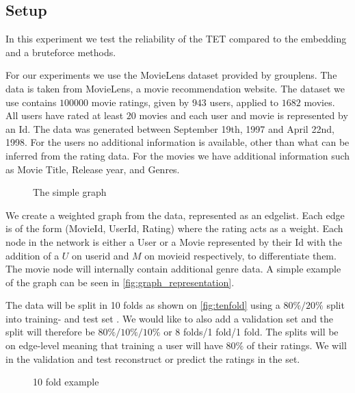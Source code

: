 \subsection{Setup}\label{Subsec:setup}
In this experiment we test the reliability of the TET compared to the embedding and a bruteforce methods. 

For our experiments we use the MovieLens dataset provided by grouplens\cite{Grouplensdata}.
The data is taken from MovieLens, a movie recommendation website. The dataset we use contains $100000$ movie ratings, given by $943$ users, applied to $1682$ movies.
All users have rated at least $20$ movies and each user and movie is represented by an Id.
The data was generated between September 19th, 1997 and April 22nd, 1998. For the users no additional information is available, other than what can be inferred from the rating data. For the movies we have additional information such as Movie Title, Release year, and Genres.

\begin{figure}[H]
	\centering
	\begin{adjustbox}{width=0.5\textwidth}
		
	\end{adjustbox}
	\caption{The simple graph}
	\label{fig:graph_representation}
\end{figure}

We create a weighted graph from the data, represented as an edgelist.
Each edge is of the form (MovieId, UserId, Rating) where the rating acts as a weight.
Each node in the network is either a User or a Movie represented by their Id with the addition of a $U$ on userid and $M$ on movieid respectively, to differentiate them.
The movie node will internally contain additional genre data.
A simple example of the graph can be seen in \autoref{fig:graph_representation}.

The data will be split in 10 folds as shown on \autoref{fig:tenfold} using a $80\%/20\%$ split into training- and test set \cite{Ricci2015}.
We would like to also add a validation set and the split will therefore be $80\%/10\%/10\%$ or 8 folds/1 fold/1 fold.
The splits will be on edge-level meaning that training a user will have $80\%$ of their ratings.
We will in the validation and test reconstruct or predict the ratings in the set.

\begin{figure}[H]
	\centering
	\begin{adjustbox}{width=0.5\textwidth}
		
	\end{adjustbox}
	\caption{10 fold example}
	\label{fig:tenfold}
\end{figure}

